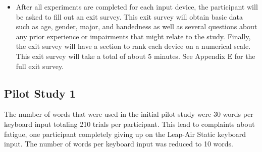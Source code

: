 \begin{itemize}
\begin{itemize}
\end{itemize}
\item After all experiments are completed for each input device, the participant will be asked to fill out an exit survey. This exit survey will obtain basic data such as age, gender, major, and handedness as well as several questions about any prior experience or impairments that might relate to the study. Finally, the exit survey will have a section to rank each device on a numerical scale. This exit survey will take a total of about 5 minutes. See Appendix E for the full exit survey.
\end{itemize}

\begin{table}[h]
\centering
\caption[Schedule of Assessments]{\centering Schedule of Assessments for a single study visit (in minutes).}
\label{table_schedule_of_assessments}
\end{table}

\subsection{Pilot Study 1}

The number of words that were used in the initial pilot study were 30 words per keyboard input totaling 210 trials per participant. This lead to complaints about fatigue, one participant completely giving up on the Leap-Air Static keyboard input. The number of words per keyboard input was reduced to 10 words.

